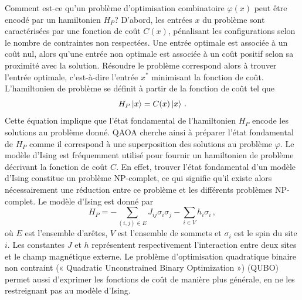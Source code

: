 Comment est-ce qu'un problème d'optimisation combinatoire $\varphi(x)$ peut être encodé par un hamiltonien $H_{P}$? D'abord, les entrées $x$ du problème sont caractérisées par une fonction de coût $C(x)$, pénalisant les configurations selon le nombre de contraintes non respectées. Une entrée optimale est associée à un coût nul, alors qu'une entrée non optimale est associée à un coût positif selon sa proximité avec la solution. Résoudre le problème correspond alors à trouver l'entrée optimale, c'est-à-dire l'entrée $x^{*}$ minimisant la fonction de coût. L'hamiltonien de problème se définit à partir de la fonction de coût tel que
\begin{equation}
    H_{P} \ket{x} = C(x) \ket{x} \,.
\end{equation}
Cette équation implique que l'état fondamental de l'hamiltonien $H_{P}$ encode les solutions au problème donné. QAOA cherche ainsi à préparer l'état fondamental de $H_{P}$ comme il correspond à une superposition des solutions au problème $\varphi$. Le modèle d'Ising est fréquemment utilisé pour fournir un hamiltonien de problème décrivant la fonction de coût $C$. En effet, trouver l'état fondamental d'un modèle d'Ising constitue un problème \textsf{NP}-complet, ce qui signifie qu'il existe alors nécessairement une réduction entre ce problème et les différents problèmes \textsf{NP}-complet. Le modèle d'Ising est donné par
\begin{equation}
    \label{eq:hamiltonien-ising}
    H_P = - \sum_{(i,j) \in E} J_{ij} \sigma_i \sigma_j - \sum_{i \in V} h_i \sigma_i \,,
\end{equation}
où $E$ est l'ensemble d'arêtes, $V$ est l'ensemble de sommets et $\sigma_{i}$ est le spin du site $i$. Les constantes $J$ et $h$ représentent respectivement l'interaction entre deux sites et le champ magnétique externe. Le problème d'optimisation quadratique binaire non contraint (« Quadratic Unconstrained Binary Optimization ») (QUBO) permet aussi d'exprimer les fonctions de coût de manière plus générale, en ne les restreignant pas au modèle d'Ising.

